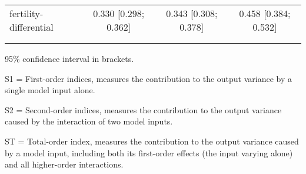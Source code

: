 \begin{table}[htp]
\begin{threeparttable}
\begin{tabular}{lccc}
	  \hspace{1.5em} fertility-differential & 0.330 [0.298; 0.362]   & 0.343 [0.308; 0.378]   & 0.458 [0.384; 0.532] \\
	 \\
    \addlinespace
    \hline
    \end{tabular}
    \begin{tablenotes}
    \scriptsize
    \item 95\% confidence interval in brackets.
    \item S1 = First-order indices,  measures the contribution to the output variance by a single model input alone.
    \item S2 = Second-order indices,  measures the contribution to the output variance caused by the interaction of two model inputs.
    \item ST = Total-order index, measures the contribution to the output variance caused by a model input, including both its first-order effects (the input varying alone) and all higher-order interactions.
    \end{tablenotes}
    \end{threeparttable}
    \end{table}